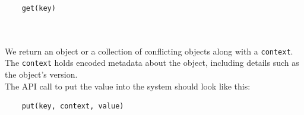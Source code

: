 \begin{verbatim}
	get(key)
\end{verbatim}


\begin{table}[htbp]
\centering
\small
{}
\end{table}
\\
\\
We return an object or a collection of conflicting objects along with a \texttt{context}. The
\texttt{context} holds encoded metadata about the object, including details such as the object's version.
\\
The API call to put the value into the system should look like this:

\begin{verbatim}
	put(key, context, value)
\end{verbatim}


